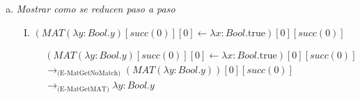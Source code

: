 \documentclass[10pt, a4paper]{article}
\newcommand{\abs}[3]{\ensuremath{\lambda#1:#2.#3}}
\newcommand{\MAT}[1]{\text{MAT}(#1)}
\newcommand{\MatGet}[3]{#1[#2][#3]}
\newcommand{\MatSet}[4]{\MatGet{#1}{#2}{#3} \leftarrow #4}
\begin{document}
\begin{enumerate}[a)]
\[
    \trfrac[(E-MatSetC)] {
        M_1 \to M_1'
    }{
        \MatSet{M_1}{X}{Y}{M_2} \to \MatSet{M_1'}{X}{Y}{M_2}
    }
\]
\[
    \trfrac[(E-MatSetXC)] {
        N \to N'
    }{
        \MatSet{M_1}{N}{O}{M_2} \to \MatSet{M_1}{N'}{O}{M_2}
    }
\]
\[
    \trfrac[(E-MatSetYC)] {
        O \to O'
    }{
        \MatSet{M_1}{N}{O}{M_2} \to \MatSet{M_1}{N}{O'}{M_2}
    }
\]
\[
    \trfrac[(E-MatGetNoMatch)]{
    }{
        \MatGet{(\MatSet{V}{I}{J}{M})}{X}{Y} \to \MatGet{V}{X}{Y}
    }
\]
\[
    \trfrac[(E-MatGetXC)]{
        N \to N'
    }{
        \MatGet{M}{N}{O} \to \MatGet{M}{N'}{O}
    }
\]
\[
    \trfrac[(E-MatGetYC)]{
        O \to O'
    }{
        \MatGet{M}{X}{O} \to \MatGet{M}{X}{O'}
    }
\]
\[
    \trfrac[(E-MatGetC)]{
        M \to M'
    }{
        \MatGet{M}{X}{Y} \to \MatGet{M'}{X}{Y}
    }
\]
\[
    \trfrac[(E-MatGetSetC)]{
        M \to M'
    }{
        \MatGet{(\MatSet{V}{X}{Y}{M})}{X}{Y} \to \MatGet{(\MatSet{V}{X}{Y}{M'})}{X}{Y}
    }
\]
\[
    \trfrac[(E-MatGetMATC)]{
        M \to M'
    }{
        \MatGet{(\MAT{M})}{X}{Y} \to \MatGet{(\MAT{M'})}{X}{Y}
    }
\]
\[
    \trfrac[(E-MatGetMAT)]{
    }{
        \MatGet{(\MAT{V})}{X}{Y} \to V
    }
\]
\[
    \trfrac[(E-MatGetSet)]{
    }{
        \MatGet{(\MatSet{V}{X}{Y}{W})}{X}{Y} \to W
    }
\]
\[
    \trfrac[(E-MatMapCF)]{
        F \to F'
    }{
        map(M, F) \to map(M, F')
    }
\]
\[
    \trfrac[(E-MatMapCM)]{
        M \to M'
    }{
        map(M, F) \to map(M', F)
    }
\]
\[
    \trfrac[(E-MatMapMAT)]{
    }{
        map(MAT[M], F) \to MAT(F M)
    }
\]
\[
    \trfrac[(E-MatMapSet)]{
    }{
        map(\MatSet{V}{X}{Y}{M}, F) \to \MatSet{map(V, F)}{X}{Y}{F\ M}
    }
\]

\item \textit{Mostrar como se reducen paso a paso}

\begin{enumerate}[I)]
    \item $\MatGet{ (\MatSet{MAT(\abs{y}{Bool}{y})}{succ(0)}{0}{\abs{x}{Bool}{\text{true}}}) }{0}{succ(0)}$
    
    \begin{align*}
        &\MatGet{ (\MatSet{MAT(\abs{y}{Bool}{y})}{succ(0)}{0}{\abs{x}{Bool}{\text{true}}}) }{0}{succ(0)}\\
        &\to_\text{(E-MatGetNoMatch)}
            \MatGet{(MAT(\abs{y}{Bool}{y})) }{0}{succ(0)}\\
        &\to_\text{(E-MatGetMAT)}
            \abs{y}{Bool}{y}
    \end{align*}


\end{enumerate}
\end{enumerate}
\end{document}
